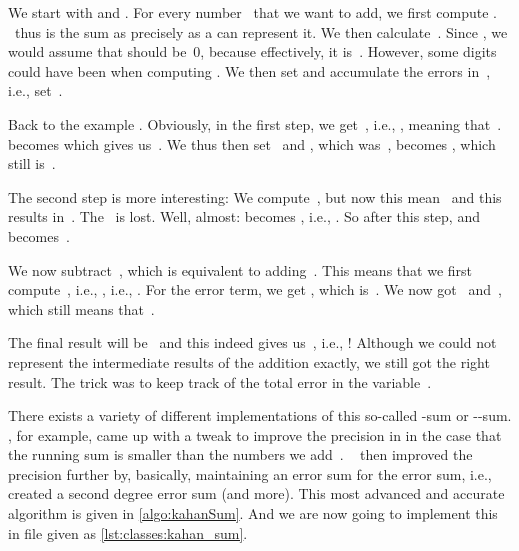 We start with  and .
For every number~ that we want to add, we first compute .
~thus is the sum as precisely as a  can represent it.
We then calculate~.
Since , we would assume that  should be~0, because effectively, it is~.
However, some digits could have been  when computing .
We then set  and accumulate the errors in~, i.e., set~.

Back to the example .
Obviously, in the first step, we get~, i.e., , meaning that~.
 becomes  which gives us~.
We thus then set~ and , which was~, becomes , which still is~.%
%
\begin{sloppypar}%
The second step is more interesting:
We compute~, but now this mean~ and this results in~.
The~ is lost.
Well, almost:
 becomes , i.e., .
So after this step,  and  becomes~.%
\end{sloppypar}%
%
\begin{sloppypar}%
We now subtract~, which is equivalent to adding~.
This means that we first compute~, i.e., , i.e., .
For the error term, we get , which is~.
We now got~ and~, which still means that~.%
\end{sloppypar}%
%
The final result will be~ and this indeed gives us~, i.e., !
Although we could not represent the intermediate results of the addition exactly, we still got the right result.
The trick was to keep track of the total error in the variable~.

There exists a variety of different implementations of this so-called \citeauthor{K1965PFRORTE}-sum or \citeauthor{K1965PFRORTE}-\citeauthor{B1968NSIMA}-sum.
, for example, came up with a tweak to improve the precision in \citeyear{N1974REVZSES} in the case that the running sum is smaller than the numbers we add~\cite{N1974REVZSES}.
~\cite{K2006AGKBSA} then improved the precision further by, basically, maintaining an error sum for the error sum, i.e., created a second degree error sum (and more).
This most advanced and accurate algorithm is given in \cref{algo:kahanSum}.
And we are now going to implement this in file  given as \cref{lst:classes:kahan_sum}.

